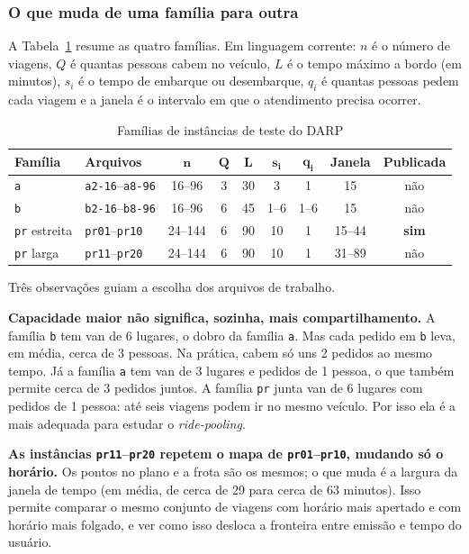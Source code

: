 \documentclass[12pt,a4paper]{article}
\theoremstyle{plain}
\begin{document}
\subsubsection{O que muda de uma família para outra}

A Tabela~\ref{tab:familias} resume as quatro famílias. Em linguagem corrente: $n$ é o número de viagens, $Q$ é quantas pessoas cabem no veículo, $L$ é o tempo máximo a bordo (em minutos), $s_i$ é o tempo de embarque ou desembarque, $q_i$ é quantas pessoas pedem cada viagem e a janela é o intervalo em que o atendimento precisa ocorrer.

\begin{table}[htbp]
\centering
\caption{Famílias de instâncias de teste do DARP}
\label{tab:familias}
\small
\begin{tabular}{@{}llccccccc@{}}
\toprule
\textbf{Família} & \textbf{Arquivos} & $\boldsymbol{n}$ & $\boldsymbol{Q}$ & $\boldsymbol{L}$ & $\boldsymbol{s_i}$ & $\boldsymbol{q_i}$ & \textbf{Janela} & \textbf{Publicada} \\
\midrule
\texttt{a}           & \texttt{a2-16}--\texttt{a8-96} & 16--96  & 3 & 30 & 3    & 1     & 15     & não \\
\texttt{b}           & \texttt{b2-16}--\texttt{b8-96} & 16--96  & 6 & 45 & 1--6 & 1--6  & 15     & não \\
\texttt{pr} estreita & \texttt{pr01}--\texttt{pr10}   & 24--144 & 6 & 90 & 10   & 1     & 15--44 & \textbf{sim} \\
\texttt{pr} larga    & \texttt{pr11}--\texttt{pr20}   & 24--144 & 6 & 90 & 10   & 1     & 31--89 & não \\
\bottomrule
\end{tabular}
\end{table}

Três observações guiam a escolha dos arquivos de trabalho.

\textbf{Capacidade maior não significa, sozinha, mais compartilhamento.} A família \texttt{b} tem van de 6 lugares, o dobro da família \texttt{a}. Mas cada pedido em \texttt{b} leva, em média, cerca de 3 pessoas. Na prática, cabem só uns 2 pedidos ao mesmo tempo. Já a família \texttt{a} tem van de 3 lugares e pedidos de 1 pessoa, o que também permite cerca de 3 pedidos juntos. A família \texttt{pr} junta van de 6 lugares com pedidos de 1 pessoa: até seis viagens podem ir no mesmo veículo. Por isso ela é a mais adequada para estudar o \textit{ride-pooling}.

\textbf{As instâncias \texttt{pr11}--\texttt{pr20} repetem o mapa de \texttt{pr01}--\texttt{pr10}, mudando só o horário.} Os pontos no plano e a frota são os mesmos; o que muda é a largura da janela de tempo (em média, de cerca de 29 para cerca de 63 minutos). Isso permite comparar o mesmo conjunto de viagens com horário mais apertado e com horário mais folgado, e ver como isso desloca a fronteira entre emissão e tempo do usuário.
\end{document}

